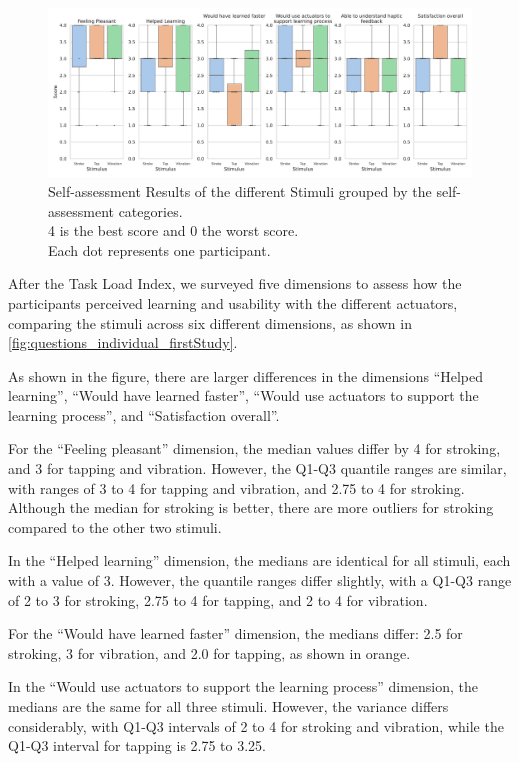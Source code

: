 \begin{figure}
    \centering
    \includegraphics[width=\linewidth]{src/pictures/Study1Data_questionnaire/questions_special_study1.pdf}
    \caption{Self-assessment Results of the different Stimuli grouped by the self-assessment categories.\\4 is the best score and 0 the worst score.\\Each dot represents one participant.}
    \label{fig:questions_individual_firstStudy}
\end{figure}

After the Task Load Index, we surveyed five dimensions to assess how the participants perceived learning and usability with the different actuators, comparing the stimuli across six different dimensions, as shown in \autoref{fig:questions_individual_firstStudy}.

As shown in the figure, there are larger differences in the dimensions \enquote{Helped learning}, \enquote{Would have learned faster}, \enquote{Would use actuators to support the learning process}, and \enquote{Satisfaction overall}.

For the \enquote{Feeling pleasant} dimension, the median values differ by 4 for stroking, and 3 for tapping and vibration. However, the Q1-Q3 quantile ranges are similar, with ranges of 3 to 4 for tapping and vibration, and 2.75 to 4 for stroking. Although the median for stroking is better, there are more outliers for stroking compared to the other two stimuli.

In the \enquote{Helped learning} dimension, the medians are identical for all stimuli, each with a value of 3. However, the quantile ranges differ slightly, with a Q1-Q3 range of 2 to 3 for stroking, 2.75 to 4 for tapping, and 2 to 4 for vibration.

For the \enquote{Would have learned faster} dimension, the medians differ: 2.5 for stroking, 3 for vibration, and 2.0 for tapping, as shown in orange.

In the \enquote{Would use actuators to support the learning process} dimension, the medians are the same for all three stimuli. However, the variance differs considerably, with Q1-Q3 intervals of 2 to 4 for stroking and vibration, while the Q1-Q3 interval for tapping is 2.75 to 3.25.

